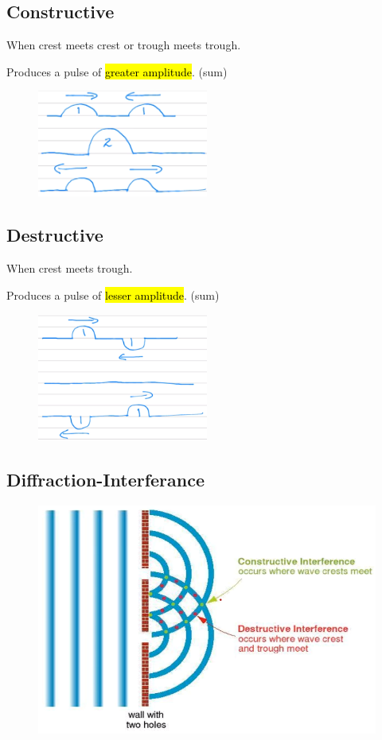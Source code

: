 \documentclass[a4paper,12pt]{article}
\begin{document}
\subsection{Constructive}
When crest meets crest or trough meets trough.

Produces a pulse of \hl{greater amplitude}. (sum)
\begin{figure}[H]
    \centering
    \includegraphics[width=0.50\textwidth]{constructive-interference}
\end{figure}

\subsection{Destructive}
When crest meets trough.

Produces a pulse of \hl{lesser amplitude}. (sum)
\begin{figure}[H]
    \centering
    \includegraphics[width=0.50\textwidth]{destructive-interference}
\end{figure}

\subsection{Diffraction-Interferance}
\begin{figure}[H]
    \centering
    \includegraphics[width=\textwidth]{interdiff}
\end{figure}
\end{document}
